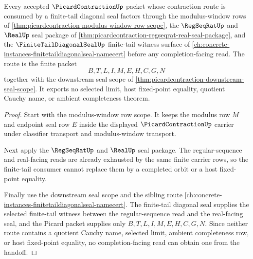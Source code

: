 \begin{theorem}
\label{thm:picardcontraction-finite-tail-diagonal-seal-handoff}
Every accepted $\PicardContractionUp$ packet whose contraction route is consumed by a finite-tail diagonal seal factors through the modulus-window rows of \autoref{thm:picardcontraction-modulus-window-row-scope}, the $\RegSeqRatUp$ and $\RealUp$ seal package of \autoref{thm:picardcontraction-regseqrat-real-seal-package}, and the $\FiniteTailDiagonalSealUp$ finite-tail witness surface of \autoref{ch:concrete-instances-finitetaildiagonalseal-namecert} before any completion-facing read. The route is the finite packet
$$
B,T,L,I,M,E,H,C,G,N
$$
together with the downstream seal scope of \autoref{thm:picardcontraction-downstream-seal-scope}. It exports no selected limit, host fixed-point equality, quotient Cauchy name, or ambient completeness theorem.
\end{theorem}
\begin{proof}
Start with the modulus-window row scope. It keeps the modulus row $M$ and endpoint seal row $E$ inside the displayed $\PicardContractionUp$ carrier under classifier transport and modulus-window transport.

Next apply the $\RegSeqRatUp$ and $\RealUp$ seal package. The regular-sequence and real-facing reads are already exhausted by the same finite carrier rows, so the finite-tail consumer cannot replace them by a completed orbit or a host fixed-point equality.

Finally use the downstream seal scope and the sibling route \autoref{ch:concrete-instances-finitetaildiagonalseal-namecert}. The finite-tail diagonal seal supplies the selected finite-tail witness between the regular-sequence read and the real-facing seal, and the Picard packet supplies only $B,T,L,I,M,E,H,C,G,N$. Since neither route contains a quotient Cauchy name, selected limit, ambient completeness row, or host fixed-point equality, no completion-facing read can obtain one from the handoff.
\end{proof}

